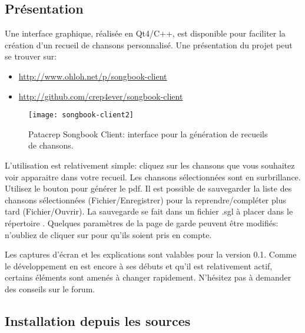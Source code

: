 \documentclass[versionenligne]{patacrep}
\newcommand{\Touche}[1]{\Ovalbox{#1}}
\begin{document}
\subsection{Présentation}

Une interface graphique, réalisée en Qt4/C++, est disponible pour
faciliter la création d'un recueil de chansons personnalisé.
Une présentation du projet peut se trouver sur:
\begin{itemize}
\item \url{http://www.ohloh.net/p/songbook-client}
\item \url{http://github.com/crep4ever/songbook-client}
\end{itemize}

\begin{figure}[h]
  \centering
  \texttt{[image: songbook-client2]}
  \caption{Patacrep Songbook Client: interface pour la génération de recueils de chansons.}
  \label{fig:sb-client}
\end{figure}

L'utilisation est relativement simple: cliquez sur les chansons que
vous souhaitez voir apparaitre dans votre recueil.  Les chansons
sélectionnées sont en surbrillance. Utilisez le bouton
\Touche{Générer} pour générer le pdf. Il est possible de sauvegarder
la liste des chansons sélectionnées (Fichier/Enregistrer) pour la
reprendre/compléter plus tard (Fichier/Ouvrir). La sauvegarde se fait
dans un fichier .sgl à placer dans le répertoire
. Quelques paramètres de la page de garde peuvent
être modifiés: n'oubliez de cliquer sur \Touche{Appliquer} pour qu'ils
soient pris en compte.

\begin{nota}
Les captures d'écran et les explications sont valables pour la version 0.1. Comme le développement en est encore à ses débuts et qu'il est relativement actif, certains éléments sont amenés à changer rapidement. N'hésitez pas à demander des conseils sur le forum.
\end{nota}

\subsection{Installation depuis les sources}
\end{document}
